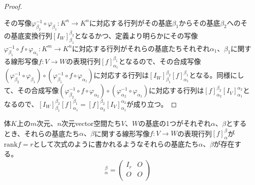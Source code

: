 \documentclass[dvipdfmx]{jsarticle}
\begin{document}
\begin{proof}
\begin{center}
\begin{tikzpicture}[auto]
    \end{tikzpicture} 
\end{center}
その写像$\varphi_{\beta_{2}}^{- 1} \circ \varphi_{\beta_{1}}:K^{n} \rightarrow K^{n}$に対応する行列がその基底$\beta_{1}$からその基底$\beta_{2}$へのその基底変換行列$\left[ I_{W} \right]^{\beta_{2}}_{\beta_{1}}$となるかつ、定義より明らかにその写像$\varphi_{\beta_{1}}^{- 1} \circ f \circ \varphi_{\alpha_{1}}:K^{m} \rightarrow K^{n}$に対応する行列がそれらの基底たちそれぞれ$\alpha_{1}$、$\beta_{1}$に関する線形写像$f:V \rightarrow W$の表現行列$[ f]^{\beta_{1}}_{\alpha_{1}}$となるので、その合成写像$\left( \varphi_{\beta_{2}}^{- 1} \circ \varphi_{\beta_{1}} \right) \circ \left( \varphi_{\beta_{1}}^{- 1} \circ f \circ \varphi_{\alpha_{1}} \right)$に対応する行列は$\left[ I_{W} \right]^{\beta_{2}}_{\beta_{1}}[ f]^{\beta_{1}}_{\alpha_{1}}$となる。同様にして、その合成写像$\left( \varphi_{\beta_{2}}^{- 1} \circ f \circ \varphi_{\alpha_{2}} \right) \circ \left( \varphi_{\alpha_{2}}^{- 1} \circ \varphi_{\alpha_{1}} \right)$に対応する行列は$[ f]^{\beta_{2}}_{\alpha_{2}}\left[ I_{V} \right]^{\alpha_{2}}_{\alpha_{1}}$となるので、$\left[ I_{W} \right]^{\beta_{2}}_{\beta_{1}}[ f]^{\beta_{1}}_{\alpha_{1}} = [ f]^{\beta_{2}}_{\alpha_{2}}\left[ I_{V} \right]^{\alpha_{2}}_{\alpha_{1}}$が成り立つ。
\end{proof}
\begin{thm}
\label{2.1.5.13}
体$K$上の$m$次元、$n$次元vector空間たち$V$、$W$の基底の1つがそれぞれ$\alpha$、$\beta$とするとき、それらの基底たち$\alpha 、\beta$に関する線形写像$f:V \rightarrow W$の表現行列$[ f]^{\beta}_{\alpha}$が${\mathrm{rank}}f = r$として次式のように書かれるようなそれらの基底たち$\alpha$、$\beta$が存在する。
\begin{align*}
[ f]^{\beta}_{\alpha} = \begin{pmatrix}
I_{r} & O \\
O & O \\
\end{pmatrix}
\end{align*}
\end{thm}
\end{document}

